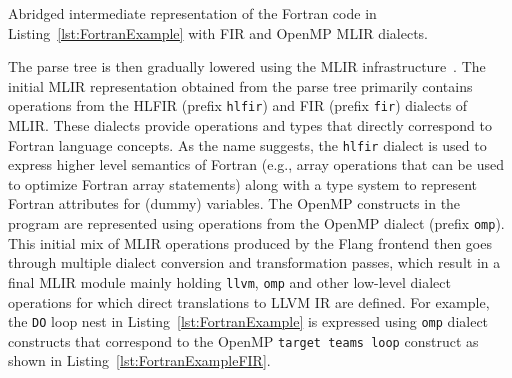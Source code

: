 \documentclass[acmtog,natbib=false]{acmart}
\newcommand{\code}[1]{\texttt{#1}\xspace}
\begin{document}
\begin{listing}[t]
\inputminted{MLIR-lexer.py:MlirLexer -x}{code/tgt_loop_abridged.fir}
\caption{Abridged intermediate representation of the Fortran code in Listing~\ref{lst:FortranExample} with \acs{FIR} and OpenMP \acs{MLIR} dialects.}
\label{lst:FortranExampleFIR}
\end{listing}



The parse tree is then gradually lowered using the \ac{MLIR} infrastructure~\cite{mlir}. The initial \ac{MLIR} representation obtained from the parse tree primarily contains operations from the \ac{HLFIR} (prefix \code{hlfir}) and \ac{FIR} (prefix \code{fir}) dialects of \ac{MLIR}.
These dialects provide operations and types that directly correspond to Fortran language concepts.
As the name suggests, the \code{hlfir} dialect is used to express higher level semantics of Fortran (e.g., array operations that can be used to optimize Fortran array statements) along with a type system to represent Fortran attributes for (dummy) variables.
The OpenMP constructs in the program are represented using operations from the OpenMP dialect (prefix \code{omp}).
This initial mix of \ac{MLIR} operations produced by the Flang frontend then goes through multiple dialect conversion and transformation passes, which result in a final \ac{MLIR} module mainly holding \code{llvm}, \code{omp} and other low-level dialect operations for which direct translations to LLVM \ac{IR} are defined.
For example, the \code{DO} loop nest in Listing~\ref{lst:FortranExample} is expressed using \code{omp} dialect constructs that correspond to the OpenMP \code{target teams loop} construct as shown in Listing~\ref{lst:FortranExampleFIR}.
\end{document}
